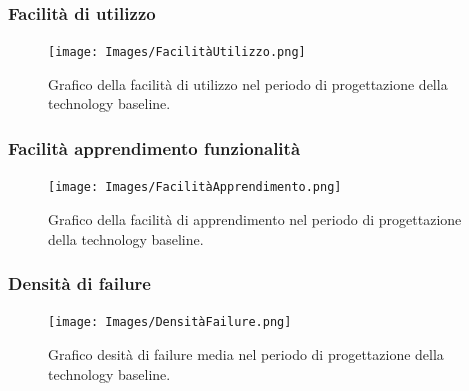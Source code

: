 \subsubsection{Facilità di utilizzo}
\begin{figure}[h]
	\centering
	\texttt{[image: Images/FacilitàUtilizzo.png]}
	\caption{Graﬁco della facilità di utilizzo nel periodo di progettazione della technology baseline.}
\end{figure}

\subsubsection{Facilità apprendimento funzionalità}
\begin{figure}[h]
	\centering
	\texttt{[image: Images/FacilitàApprendimento.png]}
	\caption{Graﬁco della facilità di apprendimento nel periodo di progettazione della technology baseline.}
\end{figure}

\newpage
\subsubsection{Densità di failure}
\begin{figure}[h]
	\centering
	\texttt{[image: Images/DensitàFailure.png]}
	\caption{Graﬁco desità di failure media nel periodo di progettazione della technology baseline.}
\end{figure}